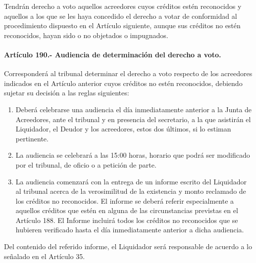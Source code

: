 \documentclass[
]{book}
\begin{document}
Tendrán derecho a voto aquellos acreedores cuyos créditos estén reconocidos y aquellos a los que se les haya concedido el derecho a votar de conformidad al procedimiento dispuesto en el Artículo siguiente, aunque sus créditos no estén reconocidos, hayan sido o no objetados o impugnados.

\hypertarget{artuxedculo-190.--audiencia-de-determinaciuxf3n-del-derecho-a-voto.}{%
\paragraph*{Artículo 190.- Audiencia de determinación del derecho a voto.}\label{artuxedculo-190.--audiencia-de-determinaciuxf3n-del-derecho-a-voto.}}

Corresponderá al tribunal determinar el derecho a voto respecto de los acreedores indicados en el Artículo anterior cuyos créditos no estén reconocidos, debiendo sujetar su decisión a las reglas siguientes:

\begin{enumerate}
\def\labelenumi{\arabic{enumi})}
\item
  Deberá celebrarse una audiencia el día inmediatamente anterior a la Junta de Acreedores, ante el tribunal y en presencia del secretario, a la que asistirán el Liquidador, el Deudor y los acreedores, estos dos últimos, si lo estiman pertinente.
\item
  La audiencia se celebrará a las 15:00 horas, horario que podrá ser modificado por el tribunal, de oficio o a petición de parte.
\item
  La audiencia comenzará con la entrega de un informe escrito del Liquidador al tribunal acerca de la verosimilitud de la existencia y monto reclamado de los créditos no reconocidos. El informe se deberá referir especialmente a aquellos créditos que estén en alguna de las circunstancias previstas en el Artículo 188. El Informe incluirá todos los créditos no reconocidos que se hubieren verificado hasta el día inmediatamente anterior a dicha audiencia.
\end{enumerate}

Del contenido del referido informe, el Liquidador será responsable de acuerdo a lo señalado en el Artículo 35.
\end{document}
